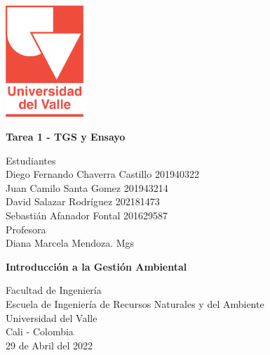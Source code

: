 \begin{titlepage}
    \begin{center}
        \vspace*{1cm}

        \begin{Huge}
        \end{Huge}

        \includegraphics[width=0.22\textwidth]{img/universidadDelValle.png}
        
        \vfill
        \textbf{Tarea 1 - TGS y Ensayo}\\
        \vfill
        
        Estudiantes\\
        Diego Fernando Chaverra Castillo 201940322\\
        Juan Camilo Santa Gomez 201943214\\
        David Salazar Rodríguez 202181473\\
        Sebastián Afanador Fontal 201629587\\
        \vfill
        Profesora\\
        Diana Marcela Mendoza. Mgs
        
        
        \vfill

        \textbf{Introducción a la Gestión Ambiental}
        
        \vfill
           
        Facultad de Ingeniería\\
        Escuela de Ingeniería de Recursos Naturales y del Ambiente\\
        Universidad del Valle\\
        Cali - Colombia\\
        \vfill
        29 de Abril del 2022

    \end{center}
\end{titlepage}